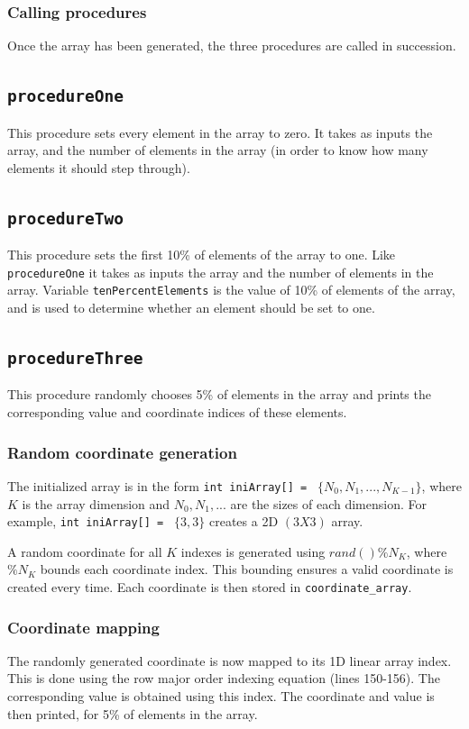 \documentclass[10pt, conference]{IEEEtran}
\begin{document}
\subsubsection{Calling procedures}
Once the array has been generated, the three procedures are called in succession.

\subsection{\texttt{procedureOne}}
This procedure sets every element in the array to zero. It takes as inputs the array, and the number of elements in the array (in order to know how many elements it should step through).

\subsection{\texttt{procedureTwo}}
This procedure sets the first 10\% of elements of the array to one. Like \texttt{procedureOne} it takes as inputs the array and the number of elements in the array. Variable \texttt{tenPercentElements} is the value of 10\% of elements of the array, and is used to determine whether an element should be set to one.

\subsection{\texttt{procedureThree}}
This procedure randomly chooses 5\% of elements in the array and prints the corresponding value and coordinate indices of these elements.
\subsubsection{Random coordinate generation}
The initialized array is in the form  \texttt{int iniArray[] = } $\{N_0 , N_1 , ... , N_{K-1} \}$, where $K$ is the array dimension and $N_0 , N_1 , ...$ are the sizes of each dimension. For example, \texttt{int iniArray[] = } $\{3 , 3 \}$ creates a 2D $(3 X 3)$ array.\newline\newline

A random coordinate for all $K$ indexes is generated using \texttt{$rand()\%N_K$}, where \texttt{$\%N_K$} bounds each coordinate index. This bounding ensures a valid coordinate is created every time. Each coordinate is then stored in  \texttt{coordinate\_array}.
\subsubsection{Coordinate mapping}
The randomly generated coordinate is now mapped to its 1D linear array index. This is done using the row major order indexing equation (lines 150-156). The corresponding value is obtained using this index. The coordinate and value is then printed, for 5\% of elements in the array.
\end{document}

